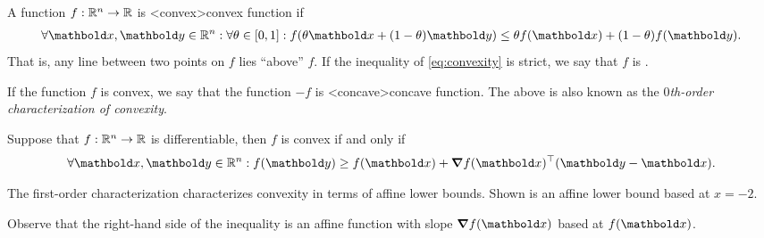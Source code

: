 \begin{defn}
  A function $f : \mathbb{R}^n \to \mathbb{R}$ is \midx<convex>{convex function} if \begin{align}
    \forall \vx, \vy \in \R^n : \forall \theta \in [0,1] : f(\theta\vx + (1-\theta)\vy) \leq \theta f(\vx) + (1-\theta) f(\vy). \label{eq:convexity}
  \end{align}
  That is, any line between two points on $f$ lies ``above'' $f$.
  If the inequality of \cref{eq:convexity} is strict, we say that $f$ is .
\end{defn}

If the function $f$ is convex, we say that the function $-f$ is \midx<concave>{concave function}.
The above is also known as the \emph{$0$th-order characterization of convexity}.

\begin{thm}\label{thm:fo-characterization-convexity}
  Suppose that $f : \mathbb{R}^n \to \mathbb{R}$ is differentiable, then $f$ is convex if and only if \begin{align}
    \forall \vx, \vy \in \R^n : f(\vy) \geq f(\vx) + \transpose{\grad f(\vx)}(\vy - \vx).
  \end{align}
\end{thm}

\begin{marginfigure}
  \caption{The first-order characterization characterizes convexity in terms of affine lower bounds.
  Shown is an affine lower bound based at $x = -2$.}
\end{marginfigure}

Observe that the right-hand side of the inequality is an affine function with slope $\grad f(\vx)$ based at $f(\vx)$.

